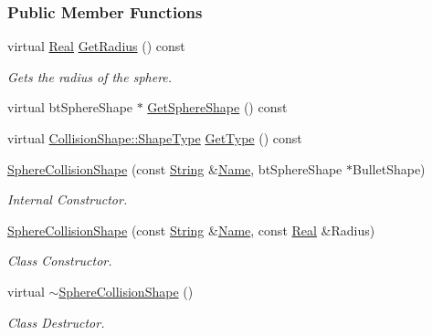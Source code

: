 \subsubsection*{Public Member Functions}
\begin{DoxyCompactItemize}
\item 
virtual \hyperlink{namespaceMezzanine_a726731b1a7df72bf3583e4a97282c6f6}{Real} \hyperlink{classMezzanine_1_1SphereCollisionShape_aaebd4bf8c8f42e59c4f25e61d7571581}{GetRadius} () const 
\begin{DoxyCompactList}\small\item\em Gets the radius of the sphere. \item\end{DoxyCompactList}\item 
virtual btSphereShape $\ast$ \hyperlink{classMezzanine_1_1SphereCollisionShape_aaae77c39b360ac6d1c7c8f0f4a09f530}{GetSphereShape} () const 
\item 
virtual \hyperlink{classMezzanine_1_1CollisionShape_ad04186055565998879b64176d6dd100d}{CollisionShape::ShapeType} \hyperlink{classMezzanine_1_1SphereCollisionShape_ad2c8d33b21fe7215742db4551429c5a6}{GetType} () const 
\item 
\hyperlink{classMezzanine_1_1SphereCollisionShape_a201f7866f6f3ac9dbde386c826797d51}{SphereCollisionShape} (const \hyperlink{namespaceMezzanine_acf9fcc130e6ebf08e3d8491aebcf1c86}{String} \&\hyperlink{classMezzanine_1_1CollisionShape_aac524c5c56fa4d158bc071f8aecfbe79}{Name}, btSphereShape $\ast$BulletShape)
\begin{DoxyCompactList}\small\item\em Internal Constructor. \item\end{DoxyCompactList}\item 
\hyperlink{classMezzanine_1_1SphereCollisionShape_ad847ecc1fb38331b3b701d07f86ab29a}{SphereCollisionShape} (const \hyperlink{namespaceMezzanine_acf9fcc130e6ebf08e3d8491aebcf1c86}{String} \&\hyperlink{classMezzanine_1_1CollisionShape_aac524c5c56fa4d158bc071f8aecfbe79}{Name}, const \hyperlink{namespaceMezzanine_a726731b1a7df72bf3583e4a97282c6f6}{Real} \&Radius)
\begin{DoxyCompactList}\small\item\em Class Constructor. \item\end{DoxyCompactList}\item 
\hypertarget{classMezzanine_1_1SphereCollisionShape_ad6ffdf8da312eb1eea4b8ef3b6393482}{
virtual \hyperlink{classMezzanine_1_1SphereCollisionShape_ad6ffdf8da312eb1eea4b8ef3b6393482}{$\sim$SphereCollisionShape} ()}
\label{classMezzanine_1_1SphereCollisionShape_ad6ffdf8da312eb1eea4b8ef3b6393482}

\begin{DoxyCompactList}\small\item\em Class Destructor. \item\end{DoxyCompactList}\end{DoxyCompactItemize}


